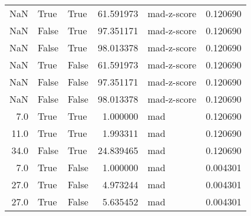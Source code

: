 \begin{table}[htp]
\begin{tabular}{rllrlr}
         NaN &           True &        True &  61.591973 & mad-z-score &  0.120690 \\
         NaN &          False &        True &  97.351171 & mad-z-score &  0.120690 \\
         NaN &          False &        True &  98.013378 & mad-z-score &  0.120690 \\
         NaN &           True &       False &  61.591973 & mad-z-score &  0.120690 \\
         NaN &          False &       False &  97.351171 & mad-z-score &  0.120690 \\
         NaN &          False &       False &  98.013378 & mad-z-score &  0.120690 \\
         7.0 &           True &        True &   1.000000 &         mad &  0.120690 \\
        11.0 &           True &        True &   1.993311 &         mad &  0.120690 \\
        34.0 &          False &        True &  24.839465 &         mad &  0.120690 \\
         7.0 &           True &       False &   1.000000 &         mad &  0.004301 \\
        27.0 &           True &       False &   4.973244 &         mad &  0.004301 \\
        27.0 &           True &       False &   5.635452 &         mad &  0.004301 \\
\bottomrule
\end{tabular}
\end{table}
